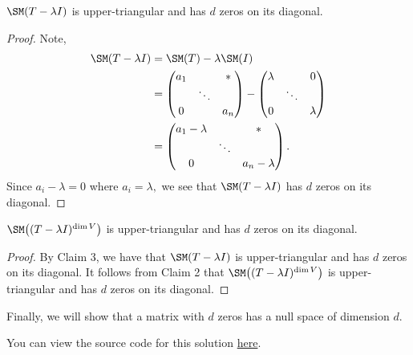 \documentclass{amsart}
\newcommand{\pagenum}{260}
\newcommand{\probnum}{11}
\begin{document}
\begin{claim}
$\SM(T-\lambda I)$ is upper-triangular and has $d$
zeros on its diagonal.
\end{claim}
\begin{proof}
Note,
\begin{align*}
    \SM(T-\lambda I) &= \SM(T)-\lambda\SM(I) \\
                     &= \begin{pmatrix}
                         a_{1} & & * \\
                               & \ddots & \\
                         0 & & a_{n}
                     \end{pmatrix}
                     -
                     \begin{pmatrix}
                         \lambda & & 0 \\
                                 & \ddots & \\
                         0 & & \lambda
                     \end{pmatrix} \\
                     &= \begin{pmatrix}
                         a_{1}-\lambda & & * \\
                                       & \ddots & \\
                         0 & & a_{n}-\lambda
                     \end{pmatrix}.
\end{align*}
Since $a_i-\lambda=0$ where $a_i=\lambda,$ we see that $\SM(T-\lambda I)$
has $d$ zeros on its diagonal.
\end{proof}

\begin{claim}
$\SM\big((T-\lambda I)^{\dim V}\big)$ is upper-triangular
and has $d$ zeros on its diagonal.
\end{claim}
\begin{proof}
By Claim 3, we have that $\SM(T-\lambda I)$ is upper-triangular
and has $d$ zeros on its diagonal. It follows from Claim 2
that $\SM\big((T-\lambda I)^{\dim V}\big)$ is upper-triangular
and has $d$ zeros on its diagonal.
\end{proof}

Finally, we will show that a matrix with $d$ zeros has
a null space of dimension $d.$

\vspace{0.5in}

\begin{note*}
You can view the source code for this solution
\href{https://github.com/thomasbreydo/linalg/blob/main/\pagenum_\probnum_Thomas_Breydo.tex}
{here}.
\end{note*}
\end{document}

